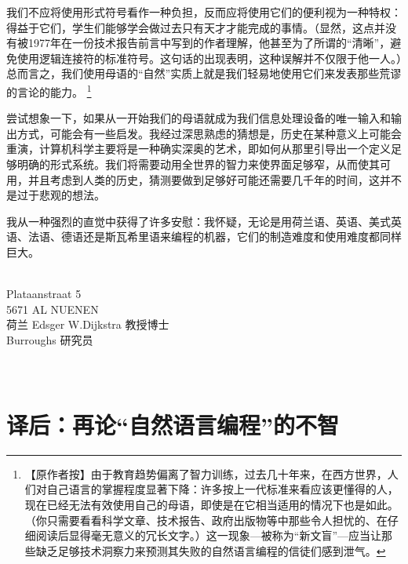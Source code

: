 \documentclass[a4paper,12pt]{article}
\begin{document}
我们不应将使用形式符号看作一种负担，反而应将使用它们的便利视为一种特权：得益于它们，学生们能够学会做过去只有天才才能完成的事情。（显然，这点并没有被1977年在一份技术报告前言中写到的作者理解，他甚至为了所谓的“清晰”，避免使用逻辑连接符的标准符号。这句话的出现表明，这种误解并不仅限于他一人。）总而言之，我们使用母语的“自然”实质上就是我们轻易地使用它们来发表那些荒谬的言论的能力。
\footnote{【原作者按】由于教育趋势偏离了智力训练，过去几十年来，在西方世界，人们对自己语言的掌握程度显著下降：许多按上一代标准来看应该更懂得的人，现在已经无法有效使用自己的母语，即使是在它相当适用的情况下也是如此。（你只需要看看科学文章、技术报告、政府出版物等中那些令人担忧的、在仔细阅读后显得毫无意义的冗长文字。）这一现象—被称为“新文盲”—应当让那些缺乏足够技术洞察力来预测其失败的自然语言编程的信徒们感到泄气。}

尝试想象一下，如果从一开始我们的母语就成为我们信息处理设备的唯一输入和输出方式，可能会有一些启发。我经过深思熟虑的猜想是，历史在某种意义上可能会重演，计算机科学主要将是一种确实深奥的艺术，即如何从那里引导出一个定义足够明确的形式系统。我们将需要动用全世界的智力来使界面足够窄，从而使其可用，并且考虑到人类的历史，猜测要做到足够好可能还需要几千年的时间，这并不是过于悲观的想法。

我从一种强烈的直觉中获得了许多安慰：我怀疑，无论是用荷兰语、英语、美式英语、法语、德语还是斯瓦希里语来编程的机器，它们的制造难度和使用难度都同样巨大。

　\\Plataanstraat 5\\
5671 AL NUENEN\\
荷兰 Edsger W.Dijkstra 教授博士\\
Burroughs 研究员\\

\appendix
　\\　\\
\section{译后：再论“自然语言编程”的不智}
\end{document}
